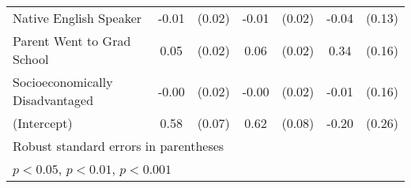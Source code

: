 {\begin{tabular}{l*{3}{cc}}
Native English Speaker&       -0.01         &      (0.02)&       -0.01         &      (0.02)&       -0.04         &      (0.13)\\
Parent Went to Grad School&        0.05\sym{*}  &      (0.02)&        0.06\sym{*}  &      (0.02)&        0.34\sym{*}  &      (0.16)\\
Socioeconomically Disadvantaged&       -0.00         &      (0.02)&       -0.00         &      (0.02)&       -0.01         &      (0.16)\\
(Intercept)         &        0.58\sym{***}&      (0.07)&        0.62\sym{***}&      (0.08)&       -0.20         &      (0.26)\\
\bottomrule
\multicolumn{7}{l}{\footnotesize Robust standard errors in parentheses}\\
\multicolumn{7}{l}{\footnotesize \sym{*} \(p<0.05\), \sym{**} \(p<0.01\), \sym{***} \(p<0.001\)}\\
\end{tabular}
}
